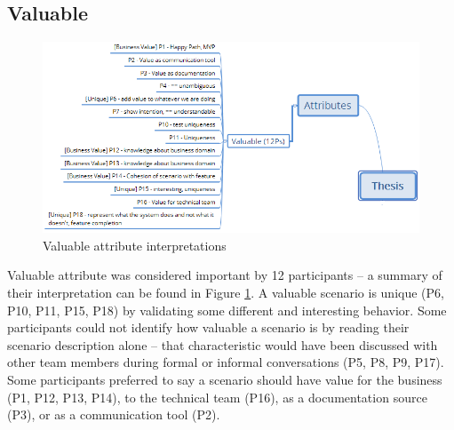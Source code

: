 \subsection{Valuable}

\begin{figure}[t]
	\centering
	\includegraphics[scale=0.8]{images/valuable_attribute}
	\caption[\hspace{2mm}Valuable attribute interpretations]{Valuable attribute interpretations}
	\label{fig:valuable_attribute}
\end{figure}

Valuable attribute was considered important by 12 participants -- a summary of their interpretation can be found in Figure \ref{fig:valuable_attribute}. A valuable scenario is unique (P6, P10, P11, P15, P18) by validating some different and interesting behavior. Some participants could not identify how valuable a scenario is by reading their scenario description alone -- that characteristic would have been discussed with other team members during formal or informal conversations (P5, P8, P9, P17). Some participants preferred to say a scenario should have value for the business (P1, P12, P13, P14), to the technical team (P16), as a documentation source (P3), or as a communication tool (P2). 

